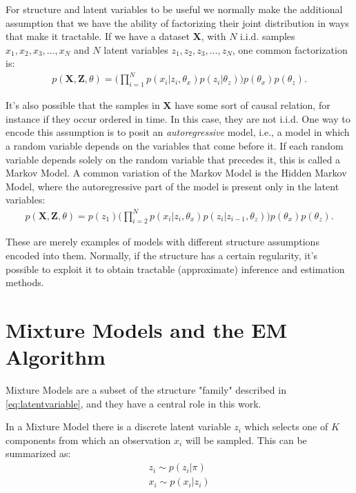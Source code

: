 For structure and latent variables to be useful we normally make the additional
assumption that we have the ability of factorizing their joint distribution in ways that
make it tractable. If we have a dataset $\mathbf{X}$, with $N$ i.i.d. samples $x_1, x_2, x_3, ..., x_N$
and $N$ latent variables $z_1, z_2, z_3, ..., z_N$, one common factorization is:
\begin{align}
    p(\mathbf{X}, \mathbf{Z}, \theta) = \Big(\prod^N_{i=1} p(x_i| z_i, \theta_x) p(z_i | \theta_z)\Big) p(\theta_x) p(\theta_z). \label{eq:latentvariable}
\end{align}

It's also possible that the samples in $\mathbf{X}$ have some sort of causal
relation, for instance if they occur ordered in time. In this case, they are not i.i.d.
One way to encode this assumption is to posit an \emph{autoregressive} model, i.e.,
a model in which a random variable depends on the variables that come before it.
If each random variable depends solely on the random variable that precedes it,
this is called a Markov Model. A common variation of the Markov Model is the
Hidden Markov Model, where the autoregressive part of the model is present only
in the latent variables:
\begin{align}
    p(\mathbf{X}, \mathbf{Z}, \theta) = p(z_1) \Big(\prod^N_{i=2} p(x_i | z_i, \theta_x) p(z_i| z_{i-1}, \theta_z) \Big) p(\theta_x) p(\theta_z).
\end{align}

These are merely examples of models with different structure assumptions encoded
into them. Normally, if the structure has a certain regularity, it's possible
to exploit it to obtain tractable (approximate) inference and estimation methods.

\section{Mixture Models and the EM Algorithm}
Mixture Models are a subset of the structure "family" described in \ref{eq:latentvariable},
and they have a central role in this work.

In a Mixture Model there is a discrete latent variable $z_i$ which selects
one of $K$ components from which an observation $x_i$ will be sampled. This
can be summarized as:
\begin{align}
    z_i \sim p(z_i | \pi) \\
    x_i \sim p(x_i | z_i)
\end{align}

